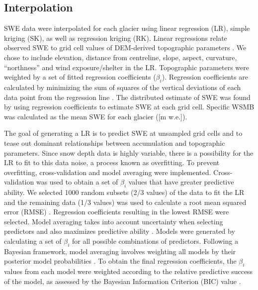 \documentclass[twocolumn,letterpaper]{igs}
\begin{document}
\subsection{Interpolation}

SWE data were interpolated for each glacier using linear regression (LR), simple kriging (SK), as well as regression kriging (RK). Linear regressions relate observed SWE to grid cell values of DEM-derived topographic parameters \citep{Davis1986}. We chose to include elevation, distance from centreline, slope, aspect, curvature, ``northness'' and wind exposure/shelter in the LR. Topographic parameters were weighted by a set of fitted regression coefficients ($\beta_i$). Regression coefficients are calculated by minimizing the sum of squares of the vertical deviations of each data point from the regression line \citep{Davis1986}. The distributed estimate of SWE was found by using regression coefficients to estimate SWE at each grid cell. Specific WSMB was calculated as the mean SWE for each glacier ([m w.e.]). 

The goal of generating a LR is to predict SWE at unsampled grid cells and to tease out dominant relationships between accumulation and topographic parameters. Since snow depth data is highly variable, there is a possibility for the LR to fit to this data noise, a process known as overfitting. To prevent overfitting, cross-validation and model averaging were implemented. Cross-validation was used to obtain a set of $\beta_i$ values that have greater predictive ability. We selected 1000 random subsets (2/3 values) of the data to fit the LR and the remaining data (1/3 values) was used to calculate a root mean squared error (RMSE) \citep{Kohavi1995}. Regression coefficients resulting in the lowest RMSE were selected. Model averaging takes into account uncertainty when selecting predictors and also maximizes predictive ability \citep{Madigan1994}. Models were generated by calculating a set of $\beta_i$ for all possible combinations of predictors. Following a Bayesian framework, model averaging involves weighting all models by their posterior model probabilities \citep{Raftery1997}. To obtain the final regression coefficients, the $\beta_i$ values from each model were weighted according to the relative predictive success of the model, as assessed by the Bayesian Information Criterion (BIC) value \citep{Burnham2004}.
\end{document}
